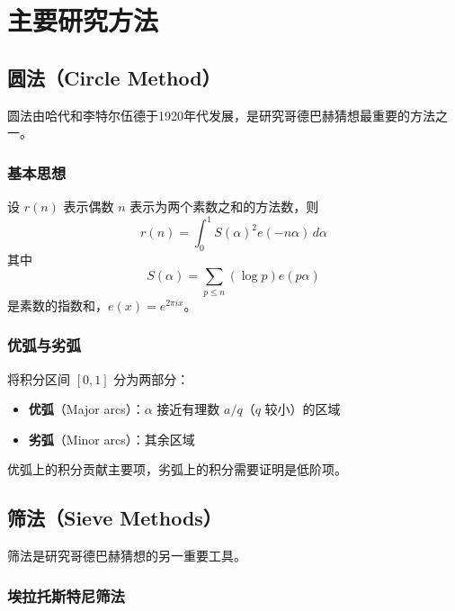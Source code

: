\section{主要研究方法}\label{sec:methods}

\subsection{圆法（Circle Method）}

圆法由哈代和李特尔伍德于1920年代发展\cite{hardy1923some}，是研究哥德巴赫猜想最重要的方法之一。

\subsubsection{基本思想}

设 $r(n)$ 表示偶数 $n$ 表示为两个素数之和的方法数，则
\begin{equation}\label{eq:circle_method}
    r(n) = \int_0^1 S(\alpha)^2 e(-n\alpha) \, d\alpha
\end{equation}
其中
\begin{equation}
    S(\alpha) = \sum_{p \leq n} (\log p) e(p\alpha)
\end{equation}
是素数的指数和，$e(x) = e^{2\pi i x}$。

\subsubsection{优弧与劣弧}

将积分区间 $[0,1]$ 分为两部分：
\begin{itemize}
    \item \textbf{优弧}（Major arcs）：$\alpha$ 接近有理数 $a/q$（$q$ 较小）的区域
    \item \textbf{劣弧}（Minor arcs）：其余区域
\end{itemize}

优弧上的积分贡献主要项，劣弧上的积分需要证明是低阶项。

\subsection{筛法（Sieve Methods）}

筛法是研究哥德巴赫猜想的另一重要工具。

\subsubsection{埃拉托斯特尼筛法}

